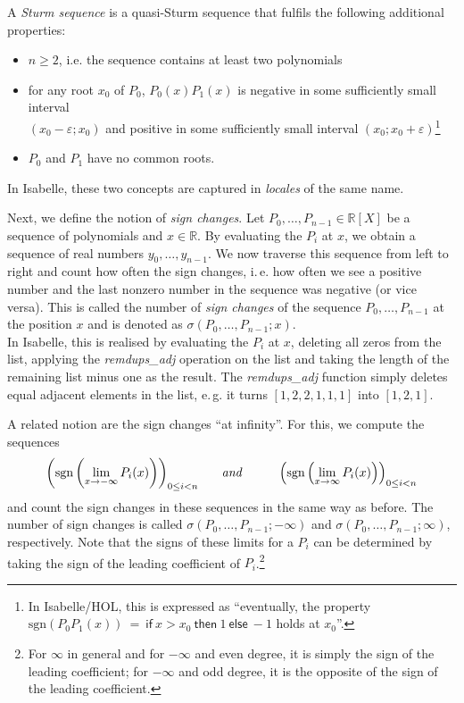 \documentclass[11pt,a4paper,oneside]{article}
\newcommand{\RR}{\mathbb{R}}
\renewcommand{\epsilon}{\varepsilon}
\newcommand{\sgn}{\mathrm{sgn}}
\newcommand{\ie}{i.\,e.\xspace}
\newcommand{\eg}{e.\,g.\xspace}
\newcommand{\isabellehol}{\mbox{Isabelle}\slash HOL\xspace}
\begin{document}
A \emph{Sturm sequence} is a quasi-Sturm sequence that fulfils the following additional properties:
\begin{itemize}
\item $n \geq 2$, i.e. the sequence contains at least two polynomials
\item for any root $x_0$ of $P_0$, $P_0(x)P_1(x)$ is negative in some sufficiently small interval\\ \mbox{$(x_0-\epsilon;x_0)$} and positive in some sufficiently small interval $(x_0;x_0+\epsilon)$\footnote{
In \isabellehol, this is expressed as \enquote{eventually, the property $\sgn(P_0P_1(x))\ =\ \mathsf{if}\ x>x_0\ \mathsf{then}\ 1\ \mathsf{else}\ -1$ holds at $x_0$}.}
\item $P_0$ and $P_1$ have no common roots.
\end{itemize}

In Isabelle, these two concepts are captured in \emph{locales} of the same name.
\vskip5mm

Next, we define the notion of \emph{sign changes}. Let $P_0,\ldots,P_{n-1}\in\RR[X]$ be a sequence of polynomials and $x\in\RR$. By evaluating the $P_i$ at $x$, we obtain a sequence of real numbers $y_0,\ldots,y_{n-1}$. We now traverse this sequence from left to right and count how often the sign changes, \ie how often we see a positive number and the last nonzero number in the sequence was negative (or vice versa). This is called the number of \emph{sign changes} of the sequence $P_0,\ldots,P_{n-1}$ at the position $x$ and is denoted as $\sigma(P_0,\ldots,P_{n-1}; x)$.\\
In Isabelle, this is realised by evaluating the $P_i$ at $x$, deleting all zeros from the list, applying the \emph{remdups\_adj} operation on the list and taking the length of the remaining list minus one as the result. The \emph{remdups\_adj} function simply deletes equal adjacent elements in the list, \eg it turns $[1,2,2,1,1,1]$ into $[1,2,1]$.

A related notion are the sign changes \enquote{at infinity}. For this, we compute the sequences
$$\left(\sgn\left(\lim\limits_{x\to -\infty} P_i(x)\right)\right)_{0\leq i < n}\hskip6mm\textit{and}\hskip10mm
\left(\sgn\left(\lim\limits_{x\to \infty} P_i(x)\right)\right)_{0\leq i < n}$$
and count the sign changes in these sequences in the same way as before. The number of sign changes is called $\sigma(P_0,\ldots,P_{n-1};-\infty)$ and $\sigma(P_0,\ldots,P_{n-1};\infty)$, respectively. Note that the signs of these limits for a $P_i$ can be determined by taking the sign of the leading coefficient of $P_i$.\footnote{For $\infty$ in general and for $-\infty$ and even degree, it is simply the sign of the leading coefficient; for $-\infty$ and odd degree, it is the opposite of the sign of the leading coefficient.}
\end{document}
